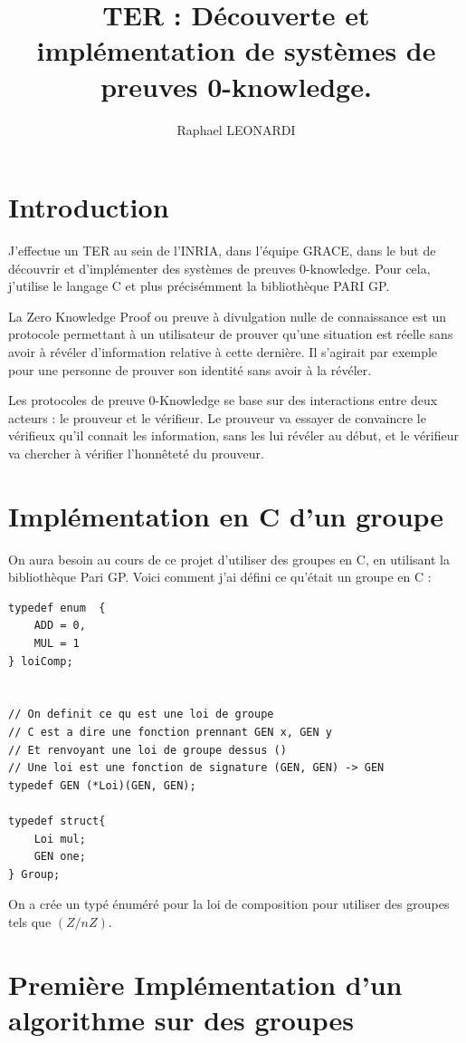 \documentclass[a4paper]{article}
\title{TER :  Découverte et implémentation de systèmes de preuves 0-knowledge.}
\author{Raphael LEONARDI}
\theoremstyle{theorem}
\theoremstyle{definition}
\begin{document}
\maketitle

\section{Introduction}

J'effectue un TER au sein de l'INRIA, dans l'équipe GRACE, dans le but de découvrir et d'implémenter des systèmes de preuves 0-knowledge. Pour cela, j'utilise le langage C et plus précisémment la bibliothèque PARI GP.

\vspace{1cm}
La Zero Knowledge Proof ou preuve à divulgation nulle de connaissance est un protocole permettant à un utilisateur de prouver qu'une situation est réelle sans avoir à révéler d'information relative à cette dernière. Il s'agirait par exemple pour une personne de prouver son identité sans avoir à la révéler.

\vspace{1cm}
Les protocoles de preuve 0-Knowledge se base sur des interactions entre deux acteurs : le prouveur et le vérifieur.  
Le prouveur va essayer de convaincre le vérifieux qu'il connait les information, sans les lui révéler au début, et le vérifieur va chercher à vérifier l'honnêteté du prouveur.

\section{Implémentation en C d'un groupe}
On aura besoin au cours de ce projet d'utiliser des groupes en C, en utilisant la bibliothèque Pari GP. Voici comment j'ai défini ce qu'était un groupe en C :
\begin{lstlisting}
typedef enum  {
    ADD = 0,
    MUL = 1
} loiComp;


// On definit ce qu est une loi de groupe
// C est a dire une fonction prennant GEN x, GEN y
// Et renvoyant une loi de groupe dessus ()
// Une loi est une fonction de signature (GEN, GEN) -> GEN
typedef GEN (*Loi)(GEN, GEN);

typedef struct{
    Loi mul;
    GEN one;
} Group;

\end{lstlisting}
On a crée un typé énuméré pour la loi de composition pour utiliser des groupes tels que $(Z/nZ)$.
\section{Première Implémentation d'un algorithme sur des groupes} 
\end{document}

